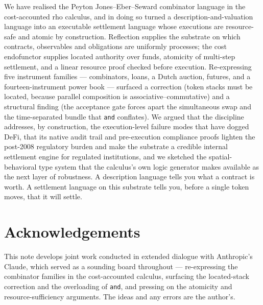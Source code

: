 \documentclass[11pt]{article}
\theoremstyle{definition}
\theoremstyle{plain}
\newcommand{\rcalc}{rho calculus}
\begin{document}
We have realised the Peyton Jones--Eber--Seward combinator language in the cost-accounted \rcalc, and
in doing so turned a description-and-valuation language into an executable settlement language whose
executions are resource-safe and atomic by construction. Reflection supplies the substrate on which
contracts, observables and obligations are uniformly processes; the cost endofunctor supplies located
authority over funds, atomicity of multi-step settlement, and a linear resource proof checked before
execution. Re-expressing five instrument families --- combinators, loans, a Dutch auction, futures,
and a fourteen-instrument power book --- surfaced a correction (token stacks must be located, because
parallel composition is associative--commutative) and a structural finding (the acceptance gate forces
apart the simultaneous swap and the time-separated bundle that \texttt{and} conflates). We argued that
the discipline addresses, by construction, the execution-level failure modes that have dogged DeFi,
that its native audit trail and pre-execution compliance proofs lighten the post-2008 regulatory
burden and make the substrate a credible internal settlement engine for regulated institutions,
and we sketched the spatial-behavioral type system that the calculus's own logic generator makes
available as the next layer of robustness. A description language tells you what a contract is worth.
A settlement language on this substrate tells you, before a single token moves, that it will settle.

\section*{Acknowledgements}
This note develops joint work conducted in extended dialogue with Anthropic's Claude, which served as
a sounding board throughout --- re-expressing the combinator families in the cost-accounted calculus,
surfacing the located-stack correction and the overloading of \texttt{and}, and pressing on the
atomicity and resource-sufficiency arguments. The ideas and any errors are the author's.
\end{document}
